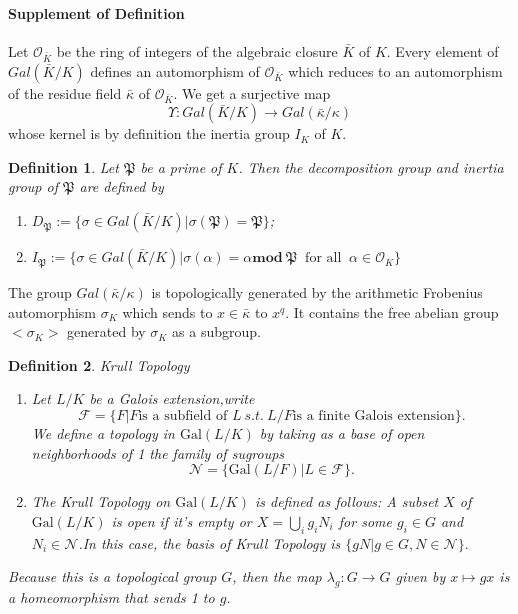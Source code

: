 \documentclass{article}
\theoremstyle{theorem}
\newtheorem{defe}{Definition}
\begin{document}
\paragraph{Supplement of Definition}
Let $\mathcal{O}_{\bar{K}}$ be the ring of integers of the algebraic closure $\bar{K}$ of $K$. Every element of $Gal(\bar{K}/K)$ defines an automorphism of $\mathcal{O}_{\bar{K}}$ which reduces to an automorphism of the residue field $\bar{\kappa}$ of $\mathcal{O}_{\bar{K}}$. We get a surjective map
\begin{equation*}
     \Upsilon: Gal(\bar{K}/K)\rightarrow Gal(\bar{\kappa}/\kappa) 
\end{equation*}
whose kernel is by definition the inertia group $I_{K}$ of $K$.
\begin{defe}
Let $\mathfrak{P}$ be a prime of $K$. Then the \emph{decomposition group} and \emph{inertia group} of $\mathfrak{P}$ are defined by
\begin{enumerate}
    \item[*] $D_{\mathfrak{P}}:=\{\sigma\in Gal(\bar{K}/K)| \sigma(\mathfrak{P})=\mathfrak{P}\}$;
    \item[*] $I_{\mathfrak{P}}:=\{\sigma\in Gal(\bar{K}/K)| \sigma(\alpha)=\alpha\textbf{mod}\ \mathfrak{P}\ \text{ for all }\ \alpha\in\mathcal{O}_{K}\}$
\end{enumerate}
\end{defe}
The group $Gal(\bar{\kappa}/\kappa)$ is topologically generated by the arithmetic Frobenius automorphism $\sigma_{K}$ which sends to $x\in\bar{\kappa}$ to $x^{q}$. It contains the free abelian group $<\sigma_{K}>$ generated by $\sigma_{K}$ as a subgroup.
\begin{defe}
\emph{Krull Topology}
\begin{enumerate}
    \item Let $L/K$ be a Galois extension,write 
$$\mathcal{F}=\{F|F \text{is a subfield of }L \ s.t.\ L/F \text{is a finite Galois extension}\}.$$
We define a topology in $\text{Gal}(L/K)$ by taking as a base of open neighborhoods of 1 the family of sugroups 
$$\mathcal{N}=\{\text{Gal}(L/F)|L\in \mathcal{F}\}.$$
\item The Krull Topology on $\text{Gal}(L/K)$ is defined as follows:  A subset $X$ of $\text{Gal}(L/K)$ is open if it's empty or $X=\bigcup\limits_{i}g_{i}N_{i}$ for some $g_{i}\in G$ and $N_{i}\in\mathcal{N}$.In this case, the basis of Krull Topology is $\{gN|g\in G,N\in\mathcal{N}\}.$
\end{enumerate}
Because this is a topological group $G$, then the map $\lambda_{g}:G\rightarrow G$ given by $x\mapsto gx$ is a homeomorphism that sends 1 to $g$. 
\end{defe}
\end{document}
